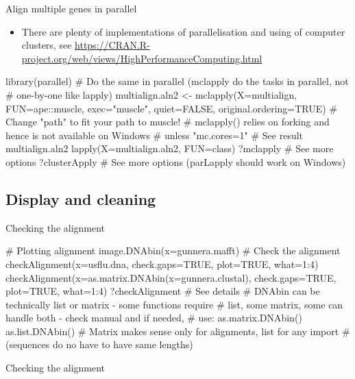 \documentclass[compress, ucs, xelatex, 11pt, xcolor=svgnames, aspectratio=169,
	hyperref={
		bookmarks=true,
		unicode=true,
		colorlinks=true,
		pdftitle={Molecular data in R},
		plainpages=false,
		pdfauthor={Vojtech Zeisek},
		pdfsubject={Course about phylogeny and evolution in R},
		pdfcreator={XeLaTeX},
		pdfkeywords={R, evolution, phylogeny, molecular data},
		linkcolor=Crimson, %
		anchorcolor=Magenta, %
		citecolor=Magenta, %
		filecolor=Magenta, %
		menucolor=Magenta, %
		urlcolor=DodgerBlue, %
		pdftex},
	url={hyphens, lowtilde} %
	]{beamer}
\renewcommand{\texttt}[1]{\colorbox{Beige}{{\ttfamily #1}}}
\begin{document}
\begin{frame}[fragile]{Align multiple genes in parallel}
	\begin{itemize}
		\item There are plenty of implementations of parallelisation and using of computer clusters, see \url{https://CRAN.R-project.org/web/views/HighPerformanceComputing.html}
	\end{itemize}
	\begin{spluscode}
    library(parallel)
    # Do the same in parallel (mclapply do the tasks in parallel, not
    # one-by-one like lapply)
    multialign.aln2 <- mclapply(X=multialign, FUN=ape::muscle,
      exec="muscle", quiet=FALSE, original.ordering=TRUE)
    # Change "path" to fit your path to muscle!
    # mclapply() relies on forking and hence is not available on Windows
    # unless "mc.cores=1"
    # See result
    multialign.aln2
    lapply(X=multialign.aln2, FUN=class)
    ?mclapply # See more options
    ?clusterApply # See more options (parLapply should work on Windows)
	\end{spluscode}
\end{frame}

\subsection{Display and cleaning}

\begin{frame}[fragile]{Checking the alignment}
	\begin{spluscode}
    # Plotting alignment
    image.DNAbin(x=gunnera.mafft)
    # Check the alignment
    checkAlignment(x=usflu.dna, check.gaps=TRUE, plot=TRUE, what=1:4)
    checkAlignment(x=as.matrix.DNAbin(x=gunnera.clustal), check.gaps=TRUE,
      plot=TRUE, what=1:4)
    ?checkAlignment # See details
    # DNAbin can be technically list or matrix - some functions require
    # list, some matrix, some can handle both - check manual and if needed,
    # use:
    as.matrix.DNAbin()
    as.list.DNAbin()
    # Matrix makes sense only for alignments, list for any import
    # (sequences do no have to have same lengths)
	\end{spluscode}
\end{frame}

\begin{frame}{Checking the alignment}
	\begin{center}
		\texttt{[image: checkalignment.png]}
	\end{center}
\end{frame}
\end{document}
